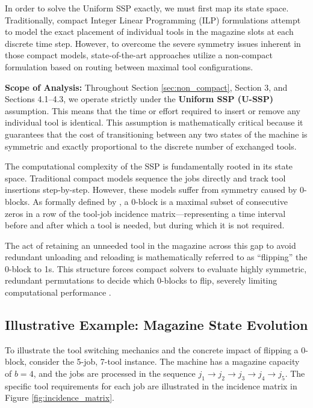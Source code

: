 \documentclass[12pt]{article}
\begin{document}
	In order to solve the Uniform SSP exactly, we must first map its state space. Traditionally, compact Integer Linear Programming (ILP) formulations attempt to model the exact placement of individual tools in the magazine slots at each discrete time step. However, to overcome the severe symmetry issues inherent in those compact models, state-of-the-art approaches utilize a non-compact formulation based on routing between maximal tool configurations.
	
	\textbf{Scope of Analysis:} Throughout Section \ref{sec:non_compact}, Section 3, and Sections 4.1--4.3, we operate strictly under the \textbf{Uniform SSP (U-SSP)} assumption. This means that the time or effort required to insert or remove any individual tool is identical. This assumption is mathematically critical because it guarantees that the cost of transitioning between any two states of the machine is symmetric and exactly proportional to the discrete number of exchanged tools.
	
	The computational complexity of the SSP is fundamentally rooted in its state space. Traditional compact models sequence the jobs directly and track tool insertions step-by-step. However, these models suffer from symmetry caused by 0-blocks. As formally defined by \citet{Crama1994}, a 0-block is a maximal subset of consecutive zeros in a row of the tool-job incidence matrix—representing a time interval before and after which a tool is needed, but during which it is not required.
	
	The act of retaining an unneeded tool in the magazine across this gap to avoid redundant unloading and reloading is mathematically referred to as ``flipping'' the 0-block to 1s. This structure forces compact solvers to evaluate highly symmetric, redundant permutations to decide which 0-blocks to flip, severely limiting computational performance \citep{Catanzaro2015}.
	
	\subsection{Illustrative Example: Magazine State Evolution}
	
	To illustrate the tool switching mechanics and the concrete impact of flipping a 0-block, consider the 5-job, 7-tool instance. The machine has a magazine capacity of $b = 4$, and the jobs are processed in the sequence $j_1 \to j_2 \to j_3 \to j_4 \to j_5$. The specific tool requirements for each job are illustrated in the incidence matrix in Figure \ref{fig:incidence_matrix}.
	
\end{document}
